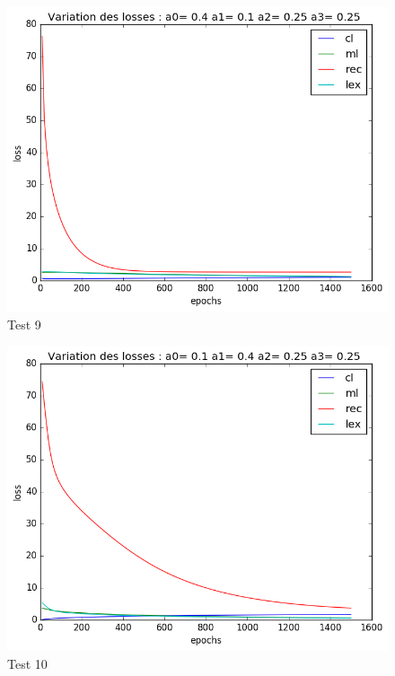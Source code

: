 \documentclass{article}
\begin{document}
\begin{figure}[!h]
  \centering
  \includegraphics[scale=0.8]{img/loss/test9.png}
  \caption{Test 9}
\end{figure}
\begin{figure}[!h]
  \centering
  \includegraphics[scale=0.8]{img/loss/test10.png}
  \caption{Test 10}
\end{figure}
\end{document}
